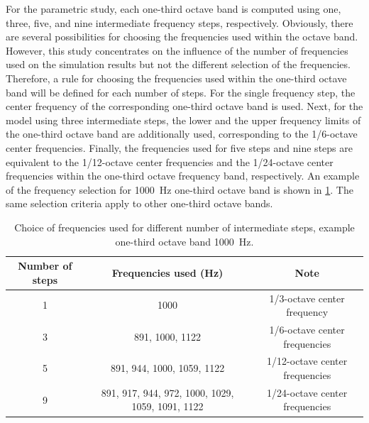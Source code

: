 For the parametric study, each one-third octave band is computed using one, three, five, and nine intermediate frequency steps, respectively. Obviously, there are several possibilities for choosing the frequencies used within the octave band. However, this study concentrates on the influence of the number of frequencies used on the simulation results but not the different selection of the frequencies. Therefore, a rule for choosing the frequencies used within the one-third octave band will be defined for each number of steps. For the single frequency step, the center frequency of the corresponding one-third octave band is used. Next, for the model using three intermediate steps, the lower and the upper frequency limits of the one-third octave band are additionally used, corresponding to the 1/6-octave center frequencies. Finally, the frequencies used for five steps and nine steps are equivalent to the 1/12-octave center frequencies and the 1/24-octave center frequencies within the one-third octave frequency band, respectively. An example of the frequency selection for \SI{1000}{\hertz} one-third octave band is shown in \cref{tab:variation_freq_steps}. The same selection criteria apply to other one-third octave bands.

\begin{table}[H]
	\caption{Choice of frequencies used for different number of intermediate steps, example one-third octave band \SI{1000}{\hertz}.}
	\centering
	\begin{tabular}{ccc}
		\toprule
		Number of steps    &  Frequencies used (Hz) & Note  \\
		\midrule
		1    &  1000  & 1/3-octave center frequency\\
		3  	 &  891, 1000, 1122 & 1/6-octave center frequencies \\
		5  	 &  891, 944, 1000, 1059, 1122 & 1/12-octave center frequencies\\
		9    &  891, 917, 944, 972, 1000, 1029, 1059, 1091, 1122 & 1/24-octave center frequencies \\
		\bottomrule
	\end{tabular}
	\label{tab:variation_freq_steps}
\end{table}